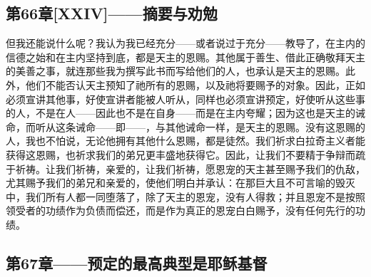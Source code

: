 
\subsection{第66章[XXIV]——摘要与劝勉}

但我还能说什么呢？我认为我已经充分——或者说过于充分——教导了，在主内的信德之始和在主内坚持到底，都是天主的恩赐。其他属于善生、借此正确敬拜天主的美善之事，就连那些我为撰写此书而写给他们的人，也承认是天主的恩赐。此外，他们不能否认天主预知了祂所有的恩赐，以及祂将要赐予的对象。因此，正如必须宣讲其他事，好使宣讲者能被人听从，同样也必须宣讲预定，好使听从这些事的人，不是在人——因此也不是在自身——而是在主内夸耀；因为这也是天主的诫命，而听从这条诫命——即——，与其他诫命一样，是天主的恩赐。没有这恩赐的人，我也不怕说，无论他拥有其他什么恩赐，都是徒然。我们祈求白拉奇主义者能获得这恩赐，也祈求我们的弟兄更丰盛地获得它。因此，让我们不要精于争辩而疏于祈祷。让我们祈祷，亲爱的，让我们祈祷，愿恩宠的天主甚至赐予我们的仇敌，尤其赐予我们的弟兄和亲爱的，使他们明白并承认：在那巨大且不可言喻的毁灭中，我们所有人都一同堕落了，除了天主的恩宠，没有人得救；并且恩宠不是按照领受者的功绩作为负债而偿还，而是作为真正的恩宠白白赐予，没有任何先行的功绩。\par


\subsection{第67章——预定的最高典型是耶稣基督}

